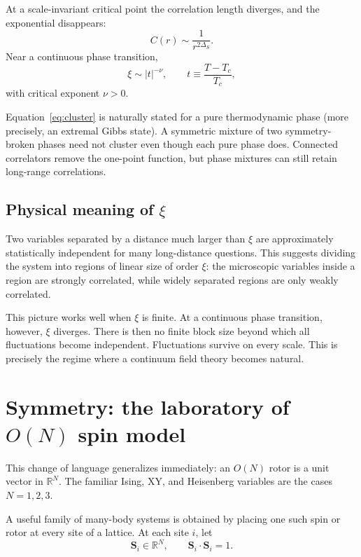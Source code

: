 \documentclass[11pt]{article}
\newcommand{\R}{\mathbb{R}}
\begin{document}
At a scale-invariant critical point the correlation length diverges, and the exponential disappears:
\begin{equation}
  C(r)\sim \frac{1}{r^{2\Delta_S}}.
  \label{eq:criticalcorr}
\end{equation}
Near a continuous phase transition,
\begin{equation}
  \xi\sim |t|^{-\nu},
  \qquad
  t\equiv \frac{T-T_c}{T_c},
  \label{eq:xinu}
\end{equation}
with critical exponent $\nu>0$.

\begin{warningbox}
Equation~\eqref{eq:cluster} is naturally stated for a pure thermodynamic phase (more precisely, an extremal Gibbs state).  A symmetric mixture of two symmetry-broken phases need not cluster even though each pure phase does.  Connected correlators remove the one-point function, but phase mixtures can still retain long-range correlations.
\end{warningbox}

\subsection{Physical meaning of \texorpdfstring{$\xi$}{xi}}

Two variables separated by a distance much larger than $\xi$ are approximately statistically independent for many long-distance questions.  This suggests dividing the system into regions of linear size of order $\xi$: the microscopic variables inside a region are strongly correlated, while widely separated regions are only weakly correlated.

This picture works well when $\xi$ is finite.  At a continuous phase transition, however, $\xi$ diverges.  There is then no finite block size beyond which all fluctuations become independent.  Fluctuations survive on every scale.  This is precisely the regime where a continuum field theory becomes natural.


\section{Symmetry: the laboratory of \texorpdfstring{$O(N)$}{O(N)} spin model}

This change of language generalizes immediately: an $O(N)$ rotor is a unit vector in $\R^N$.  The familiar Ising, XY, and Heisenberg variables are the cases $N=1,2,3$.

A useful family of many-body systems is obtained by placing one such spin or rotor at every site of a lattice.  At each site $i$, let
\begin{equation}
  \bm S_i\in \R^N,
  \qquad
  \bm S_i\cdot \bm S_i=1.
\end{equation}
\end{document}
